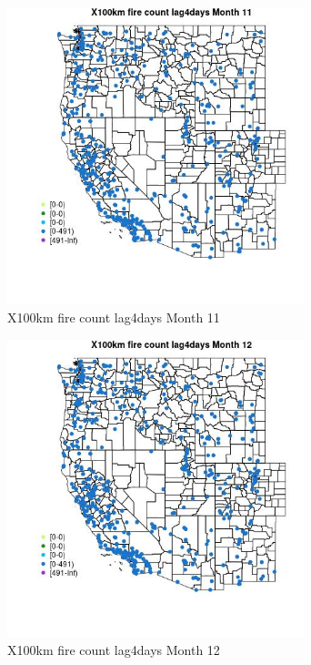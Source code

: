\begin{figure} 
\centering  
\includegraphics[width=0.77\textwidth]{Code_Outputs/Report_ML_input_PM25_Step4_part_e_de_duplicated_aves_compiled_2019-05-14wNAs_MapObsMo11X100km_fire_count_lag4days.jpg} 
\caption{\label{fig:Report_ML_input_PM25_Step4_part_e_de_duplicated_aves_compiled_2019-05-14wNAsMapObsMo11X100km_fire_count_lag4days}X100km fire count lag4days Month 11} 
\end{figure} 
 

\begin{figure} 
\centering  
\includegraphics[width=0.77\textwidth]{Code_Outputs/Report_ML_input_PM25_Step4_part_e_de_duplicated_aves_compiled_2019-05-14wNAs_MapObsMo12X100km_fire_count_lag4days.jpg} 
\caption{\label{fig:Report_ML_input_PM25_Step4_part_e_de_duplicated_aves_compiled_2019-05-14wNAsMapObsMo12X100km_fire_count_lag4days}X100km fire count lag4days Month 12} 
\end{figure} 
 

